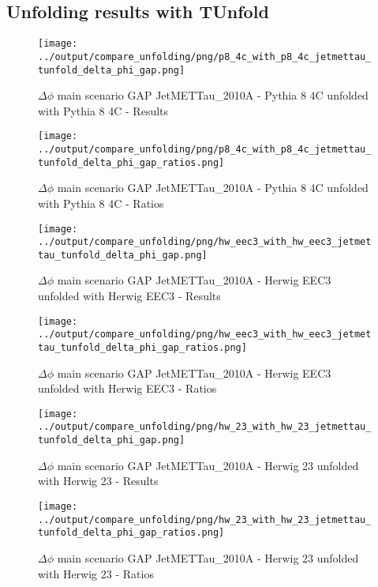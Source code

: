 \documentclass[11pt]{book}
\begin{document}
\clearpage
\subsection{Unfolding results with TUnfold}

\begin{figure}[ht]
\centering
\texttt{[image: ../output/compare\_unfolding/png/p8\_4c\_with\_p8\_4c\_jetmettau\_tunfold\_delta\_phi\_gap.png]}
\caption{$\Delta\phi$ main scenario GAP JetMETTau\_2010A - Pythia 8 4C unfolded with Pythia 8 4C - Results}
\label{p8_p8_jetmettau_tunfold_delta_phi_gap_a}
\end{figure}

\begin{figure}[ht]
\centering
\texttt{[image: ../output/compare\_unfolding/png/p8\_4c\_with\_p8\_4c\_jetmettau\_tunfold\_delta\_phi\_gap\_ratios.png]}
\caption{$\Delta\phi$ main scenario GAP JetMETTau\_2010A - Pythia 8 4C unfolded with Pythia 8 4C - Ratios}
\label{p8_p8_jetmettau_tunfold_delta_phi_gap_b}
\end{figure}

\begin{figure}[ht]
\centering
\texttt{[image: ../output/compare\_unfolding/png/hw\_eec3\_with\_hw\_eec3\_jetmettau\_tunfold\_delta\_phi\_gap.png]}
\caption{$\Delta\phi$ main scenario GAP JetMETTau\_2010A - Herwig EEC3 unfolded with Herwig EEC3 - Results}
\label{hw_eec3_hw_eec3_jetmettau_tunfold_delta_phi_gap_a}
\end{figure}

\begin{figure}[ht]
\centering
\texttt{[image: ../output/compare\_unfolding/png/hw\_eec3\_with\_hw\_eec3\_jetmettau\_tunfold\_delta\_phi\_gap\_ratios.png]}
\caption{$\Delta\phi$ main scenario GAP JetMETTau\_2010A - Herwig EEC3 unfolded with Herwig EEC3 - Ratios}
\label{hw_eec3_hw_eec3_jetmettau_tunfold_delta_phi_gap_b}
\end{figure}

\begin{figure}[ht]
\centering
\texttt{[image: ../output/compare\_unfolding/png/hw\_23\_with\_hw\_23\_jetmettau\_tunfold\_delta\_phi\_gap.png]}
\caption{$\Delta\phi$ main scenario GAP JetMETTau\_2010A - Herwig 23 unfolded with Herwig 23 - Results}
\label{hw_23_hw_23_jetmettau_tunfold_delta_phi_gap_a}
\end{figure}

\begin{figure}[ht]
\centering
\texttt{[image: ../output/compare\_unfolding/png/hw\_23\_with\_hw\_23\_jetmettau\_tunfold\_delta\_phi\_gap\_ratios.png]}
\caption{$\Delta\phi$ main scenario GAP JetMETTau\_2010A - Herwig 23 unfolded with Herwig 23 - Ratios}
\label{hw_23_hw_23_jetmettau_tunfold_delta_phi_gap_b}
\end{figure}
\end{document}
